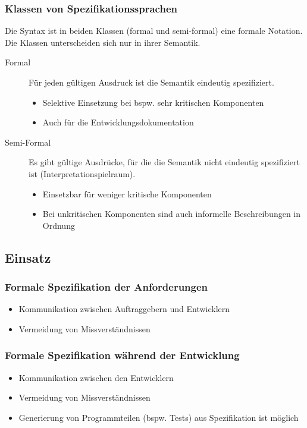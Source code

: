 			\subsubsection{Klassen von Spezifikationssprachen}
				Die Syntax ist in beiden Klassen (formal und semi-formal) eine formale Notation. Die Klassen unterscheiden sich nur in ihrer Semantik.
				\begin{description}
					\item[Formal] Für jeden gültigen Ausdruck ist die Semantik eindeutig spezifiziert.
						\begin{itemize}
							\item Selektive Einsetzung bei bspw. sehr kritischen Komponenten
							\item Auch für die Entwicklungsdokumentation
						\end{itemize}
					\item[Semi-Formal] Es gibt gültige Ausdrücke, für die die Semantik nicht eindeutig spezifiziert ist (Interpretationspielraum).
						\begin{itemize}
							\item Einsetzbar für weniger kritische Komponenten
							\item Bei unkritischen Komponenten sind auch informelle Beschreibungen in Ordnung
						\end{itemize}
				\end{description}

		\subsection{Einsatz}
			\subsubsection{Formale Spezifikation der Anforderungen}
				\begin{itemize}
					\item Kommunikation zwischen Auftraggebern und Entwicklern
					\item Vermeidung von Missverständnissen
				\end{itemize}

			\subsubsection{Formale Spezifikation während der Entwicklung}
				\begin{itemize}
					\item Kommunikation zwischen den Entwicklern
					\item Vermeidung von Missverständnissen
					\item Generierung von Programmteilen (bspw. Tests) aus Spezifikation ist möglich
				\end{itemize}

